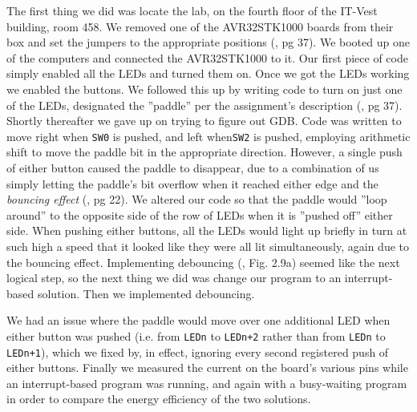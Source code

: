 The first thing we did was locate the lab, on the fourth floor of the IT-Vest building, room 458. 
We removed one of the AVR32STK1000 boards from their box and set the jumpers to the appropriate positions (\cite{lab-compendium}, pg 37).
We booted up one of the computers and connected the AVR32STK1000 to it. 
Our first piece of code simply enabled all the LEDs and turned them on. Once we got the LEDs working we enabled the buttons.
We followed this up by writing code to turn on just one of the LEDs, designated the ''paddle'' per the assignment's description (\cite{lab-compendium}, pg 37).
Shortly thereafter we gave up on trying to figure out GDB.
Code was written to move right when \texttt{SW0} is pushed, and left when\texttt{SW2} is pushed, employing arithmetic shift to move the paddle bit in the appropriate direction.
However, a single push of either button caused the paddle to disappear, due to a combination of us simply letting the paddle's bit overflow when it reached either edge and the \emph{bouncing effect} (\cite{lab-compendium}, pg 22). We altered our code so that the paddle would ''loop around'' to the opposite side of the row of LEDs when it is ''pushed off'' either side.
When pushing either buttons, all the LEDs would light up briefly in turn at such high a speed that it looked like they were all lit simultaneously, again due to the bouncing effect.
Implementing debouncing (\cite{lab-compendium}, Fig. 2.9a) seemed like the next logical step, so the next thing we did was change our program to an interrupt-based solution.
Then we implemented debouncing.

We had an issue where the paddle would move over one additional LED when either button was pushed (i.e. from \texttt{LEDn} to \texttt{LEDn+2} rather than from \texttt{LEDn} to \texttt{LEDn+1}), which we fixed by, in effect, ignoring every second registered push of either buttons.
Finally we measured the current on the board's various pins while an interrupt-based program was running, and again with a busy-waiting program in order to compare the energy efficiency of the two solutions.
